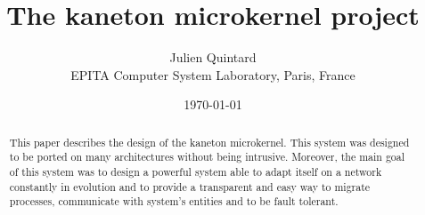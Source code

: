 \documentclass[10pt,a4wide]{article}
\title{The kaneton microkernel project}
\author{\small{Julien Quintard} \\
        \scriptsize{EPITA Computer System Laboratory, Paris, France}}
\date{\scriptsize{\today}}
\begin{document}
\maketitle


\begin{abstract}

This paper describes the design of the kaneton microkernel.
This system was designed to be ported on many architectures without being
intrusive. Moreover, the main goal of this system was to design a powerful
system able to adapt itself on a network constantly in evolution and to
provide a transparent and easy way to migrate processes, communicate
with system's entities and to be fault tolerant.

\end{abstract}

%
%
\end{document}
